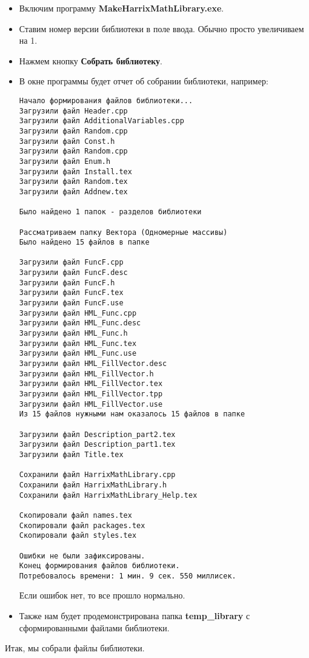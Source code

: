 \begin{itemize}
\item Включим программу \textbf{MakeHarrixMathLibrary.exe}.
\item Ставим номер версии библиотеки в поле ввода. Обычно просто увеличиваем на 1.
\item Нажмем кнопку \textbf{Собрать библиотеку}.
\item В окне программы будет отчет об собрании библиотеки, например:
\begin{lstlisting}[label=examplereport, caption=Пример отчета о сборке библиотеки]
Начало формирования файлов библиотеки...
Загрузили файл Header.cpp
Загрузили файл AdditionalVariables.cpp
Загрузили файл Random.cpp
Загрузили файл Const.h
Загрузили файл Random.cpp
Загрузили файл Enum.h
Загрузили файл Install.tex
Загрузили файл Random.tex
Загрузили файл Addnew.tex

Было найдено 1 папок - разделов библиотеки

Рассматриваем папку Вектора (Одномерные массивы)
Было найдено 15 файлов в папке

Загрузили файл FuncF.cpp
Загрузили файл FuncF.desc
Загрузили файл FuncF.h
Загрузили файл FuncF.tex
Загрузили файл FuncF.use
Загрузили файл HML_Func.cpp
Загрузили файл HML_Func.desc
Загрузили файл HML_Func.h
Загрузили файл HML_Func.tex
Загрузили файл HML_Func.use
Загрузили файл HML_FillVector.desc
Загрузили файл HML_FillVector.h
Загрузили файл HML_FillVector.tex
Загрузили файл HML_FillVector.tpp
Загрузили файл HML_FillVector.use
Из 15 файлов нужными нам оказалось 15 файлов в папке

Загрузили файл Description_part2.tex
Загрузили файл Description_part1.tex
Загрузили файл Title.tex

Сохранили файл HarrixMathLibrary.cpp
Сохранили файл HarrixMathLibrary.h
Сохранили файл HarrixMathLibrary_Help.tex

Скопировали файл names.tex
Скопировали файл packages.tex
Скопировали файл styles.tex

Ошибки не были зафиксированы.
Конец формирования файлов библиотеки.
Потребовалось времени: 1 мин. 9 сек. 550 миллисек.
\end{lstlisting}

Если ошибок нет, то все прошло нормально.
\item Также нам будет продемонстрирована папка \textbf{temp\_library} с сформированными файлами библиотеки.
\end{itemize}

Итак, мы собрали файлы библиотеки.

